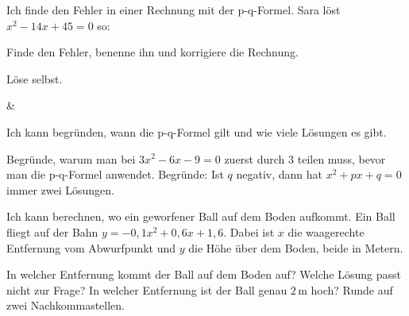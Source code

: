 \begin{aufgabe}{Ich finde den Fehler in einer Rechnung mit der p-q-Formel. Sara löst $x^2 - 14x + 45 = 0$ so:}
\begin{teile}
\teil Finde den Fehler, benenne ihn und korrigiere die Rechnung.
\end{teile}
\medskip
Löse selbst.
\begin{gleichungsraster}[2]
 & \\ \noalign{\vspace{6pt}}
\end{gleichungsraster}
\end{aufgabe}

\begin{aufgabe}{Ich kann begründen, wann die p-q-Formel gilt und wie viele Lösungen es gibt.}
\begin{teile}
\teil Begründe, warum man bei $3x^2 - 6x - 9 = 0$ zuerst durch $3$ teilen muss, bevor man die p-q-Formel anwendet.
\teil Begründe: Ist $q$ negativ, dann hat $x^2 + px + q = 0$ immer zwei Lösungen.
\end{teile}
\end{aufgabe}

\begin{aufgabe}{Ich kann berechnen, wo ein geworfener Ball auf dem Boden aufkommt. Ein Ball fliegt auf der Bahn $y = -0{,}1x^2 + 0{,}6x + 1{,}6$. Dabei ist $x$ die waagerechte Entfernung vom Abwurfpunkt und $y$ die Höhe über dem Boden, beide in Metern.}
\begin{teile}
\teil In welcher Entfernung kommt der Ball auf dem Boden auf? Welche Lösung passt nicht zur Frage?
\teil In welcher Entfernung ist der Ball genau $2\,\text{m}$ hoch? Runde auf zwei Nachkommastellen.
\end{teile}
\end{aufgabe}
